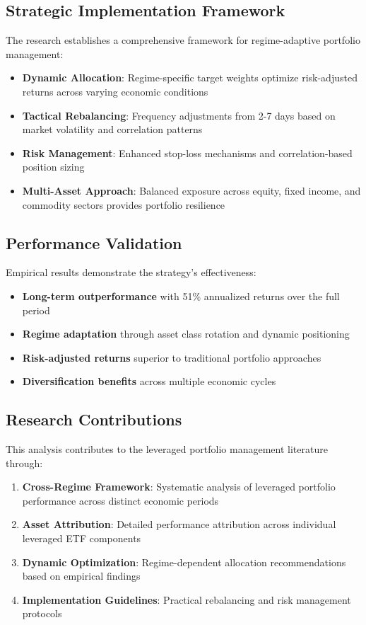 \documentclass[onecolumn,ieee]{arithmaxresearch}
\begin{document}
\subsection{Strategic Implementation Framework}

The research establishes a comprehensive framework for regime-adaptive portfolio management:

\begin{itemize}
    \item \textbf{Dynamic Allocation}: Regime-specific target weights optimize risk-adjusted returns across varying economic conditions
    \item \textbf{Tactical Rebalancing}: Frequency adjustments from 2-7 days based on market volatility and correlation patterns
    \item \textbf{Risk Management}: Enhanced stop-loss mechanisms and correlation-based position sizing
    \item \textbf{Multi-Asset Approach}: Balanced exposure across equity, fixed income, and commodity sectors provides portfolio resilience
\end{itemize}

\subsection{Performance Validation}

Empirical results demonstrate the strategy's effectiveness:
\begin{itemize}
    \item \textbf{Long-term outperformance} with 51\% annualized returns over the full period
    \item \textbf{Regime adaptation} through asset class rotation and dynamic positioning
    \item \textbf{Risk-adjusted returns} superior to traditional portfolio approaches
    \item \textbf{Diversification benefits} across multiple economic cycles
\end{itemize}

\subsection{Research Contributions}

This analysis contributes to the leveraged portfolio management literature through:
\begin{enumerate}
    \item \textbf{Cross-Regime Framework}: Systematic analysis of leveraged portfolio performance across distinct economic periods
    \item \textbf{Asset Attribution}: Detailed performance attribution across individual leveraged ETF components
    \item \textbf{Dynamic Optimization}: Regime-dependent allocation recommendations based on empirical findings
    \item \textbf{Implementation Guidelines}: Practical rebalancing and risk management protocols
\end{enumerate}
\end{document}
